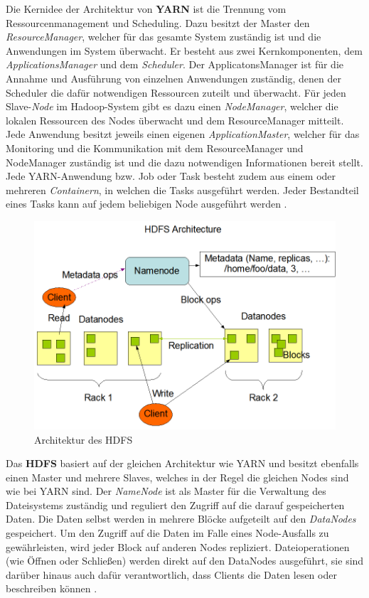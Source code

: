 Die Kernidee der Architektur von \textbf{YARN} ist die Trennung vom Ressourcenmanagement und Scheduling. Dazu besitzt der Master den \emph{ResourceManager}, welcher für das gesamte System zuständig ist und die Anwendungen im System überwacht. Er besteht aus zwei Kernkomponenten, dem \emph{ApplicationsManager} und dem \emph{Scheduler}. Der ApplicatonsManager ist für die Annahme und Ausführung von einzelnen Anwendungen zuständig, denen der Scheduler die dafür notwendigen Ressourcen zuteilt und überwacht. Für jeden Slave-\emph{Node} im Hadoop-System gibt es dazu einen \emph{NodeManager}, welcher die lokalen Ressourcen des Nodes überwacht und dem ResourceManager mitteilt. Jede Anwendung besitzt jeweils einen eigenen \emph{ApplicationMaster}, welcher für das Monitoring und die Kommunikation mit dem ResourceManager und NodeManager zuständig ist und die dazu notwendigen Informationen bereit stellt. Jede YARN-Anwendung bzw. Job oder Task besteht zudem aus einem oder mehreren \emph{Containern}, in welchen die Tasks ausgeführt werden. Jeder Bestandteil eines Tasks kann auf jedem beliebigen Node ausgeführt werden \cite{HadoopYarnArch271}.

\begin{figure}
    \centering
    \includegraphics[width=.8\columnwidth]{./images/hdfsarchitecture.png}
    \caption[Architektur des HDFS]{Architektur des HDFS \cite{HadoopHdfsDesc271}}
    \label{fig:hdfsarch}
\end{figure}

Das \textbf{HDFS} basiert auf der gleichen Architektur wie YARN und besitzt ebenfalls einen Master und mehrere Slaves, welches in der Regel die gleichen Nodes sind wie bei YARN sind. Der \emph{NameNode} ist als Master für die Verwaltung des Dateisystems zuständig und reguliert den Zugriff auf die darauf gespeicherten Daten. Die Daten selbst werden in mehrere Blöcke aufgeteilt auf den \emph{DataNodes} gespeichert. Um den Zugriff auf die Daten im Falle eines Node-Ausfalls zu gewährleisten, wird jeder Block auf anderen Nodes repliziert. Dateioperationen (wie Öffnen oder Schließen) werden direkt auf den DataNodes ausgeführt, sie sind darüber hinaus auch dafür verantwortlich, dass Clients die Daten lesen oder beschreiben können \cite{HadoopHdfsDesc271}.

